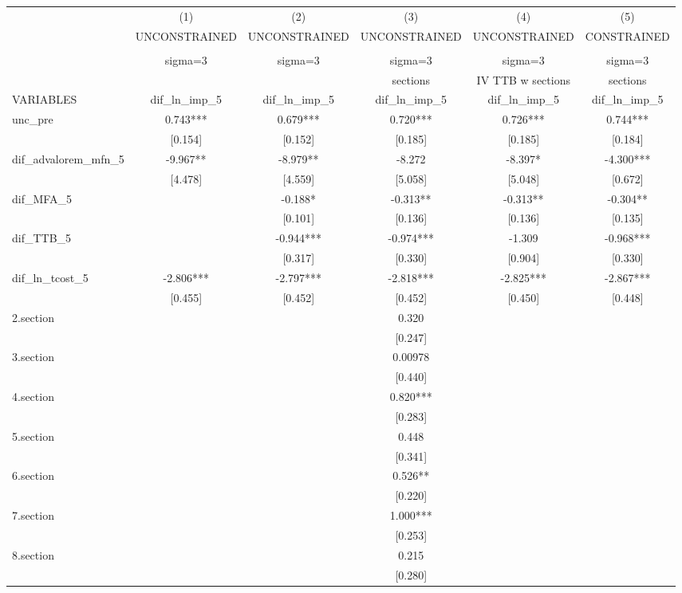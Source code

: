 \begin{tabular}{lccccc}
\toprule
 & (1) & (2) & (3) & (4) & (5) \\
 & UNCONSTRAINED & UNCONSTRAINED & UNCONSTRAINED & UNCONSTRAINED & CONSTRAINED \\
 &  &  &  &  &  \\
 & sigma=3 & sigma=3 & sigma=3 & sigma=3 & sigma=3 \\
 &  &  & sections & IV TTB w sections & sections \\
VARIABLES & dif\_ln\_imp\_5 & dif\_ln\_imp\_5 & dif\_ln\_imp\_5 & dif\_ln\_imp\_5 & dif\_ln\_imp\_5 \\
\midrule
unc\_pre & 0.743*** & 0.679*** & 0.720*** & 0.726*** & 0.744*** \\
 & [0.154] & [0.152] & [0.185] & [0.185] & [0.184] \\
dif\_advalorem\_mfn\_5 & -9.967** & -8.979** & -8.272 & -8.397* & -4.300*** \\
 & [4.478] & [4.559] & [5.058] & [5.048] & [0.672] \\
dif\_MFA\_5 &  & -0.188* & -0.313** & -0.313** & -0.304** \\
 &  & [0.101] & [0.136] & [0.136] & [0.135] \\
dif\_TTB\_5 &  & -0.944*** & -0.974*** & -1.309 & -0.968*** \\
 &  & [0.317] & [0.330] & [0.904] & [0.330] \\
dif\_ln\_tcost\_5 & -2.806*** & -2.797*** & -2.818*** & -2.825*** & -2.867*** \\
 & [0.455] & [0.452] & [0.452] & [0.450] & [0.448] \\
2.section &  &  & 0.320 &  &  \\
 &  &  & [0.247] &  &  \\
3.section &  &  & 0.00978 &  &  \\
 &  &  & [0.440] &  &  \\
4.section &  &  & 0.820*** &  &  \\
 &  &  & [0.283] &  &  \\
5.section &  &  & 0.448 &  &  \\
 &  &  & [0.341] &  &  \\
6.section &  &  & 0.526** &  &  \\
 &  &  & [0.220] &  &  \\
7.section &  &  & 1.000*** &  &  \\
 &  &  & [0.253] &  &  \\
8.section &  &  & 0.215 &  &  \\
 &  &  & [0.280] &  &  \\

\end{tabular}
